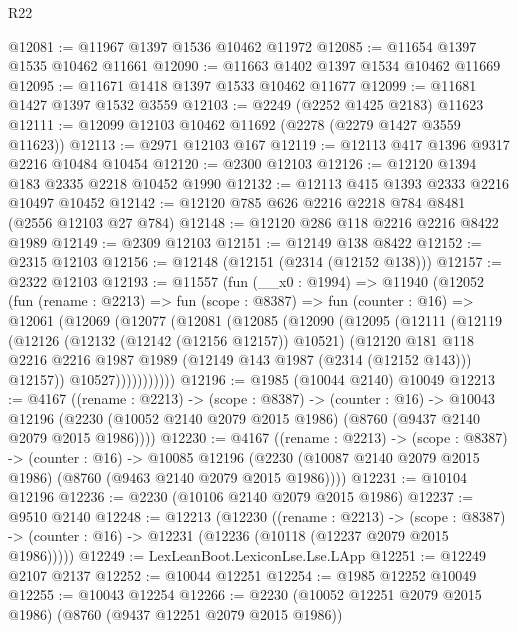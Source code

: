 \begin{lexlean}{R22}
\begin{coremodule}
@12081 := @11967 @1397 @1536 @10462 @11972
@12085 := @11654 @1397 @1535 @10462 @11661
@12090 := @11663 @1402 @1397 @1534 @10462 @11669
@12095 := @11671 @1418 @1397 @1533 @10462 @11677
@12099 := @11681 @1427 @1397 @1532 @3559
@12103 := @2249 (@2252 @1425 @2183) @11623
@12111 := @12099 @12103 @10462 @11692 (@2278 (@2279 @1427 @3559 @11623))
@12113 := @2971 @12103 @167
@12119 := @12113 @417 @1396 @9317 @2216 @10484 @10454
@12120 := @2300 @12103
@12126 := @12120 @1394 @183 @2335 @2218 @10452 @1990
@12132 := @12113 @415 @1393 @2333 @2216 @10497 @10452
@12142 := @12120 @785 @626 @2216 @2218 @784 @8481 (@2556 @12103 @27 @784)
@12148 := @12120 @286 @118 @2216 @2216 @8422 @1989
@12149 := @2309 @12103
@12151 := @12149 @138 @8422
@12152 := @2315 @12103
@12156 := @12148 (@12151 (@2314 (@12152 @138)))
@12157 := @2322 @12103
@12193 := @11557
    (fun (__x0 : @1994) =>
    @11940
      (@12052
        (fun (rename : @2213) =>
        fun (scope : @8387) =>
        fun (counter : @16) =>
        @12061
          (@12069
            (@12077
              (@12081
                (@12085
                  (@12090
                    (@12095
                      (@12111
                        (@12119
                          (@12126
                            (@12132 (@12142 (@12156 @12157)) @10521)
                            (@12120
                              @181
                              @118
                              @2216
                              @2216
                              @1987
                              @1989
                              (@12149 @143 @1987 (@2314 (@12152 @143)))
                              @12157))
                          @10527)))))))))))
@12196 := @1985 (@10044 @2140) @10049
@12213 := @4167
    ((rename : @2213) ->
    (scope : @8387) ->
    (counter : @16) ->
    @10043 @12196 (@2230 (@10052 @2140 @2079 @2015 @1986) (@8760 (@9437 @2140 @2079 @2015 @1986))))
@12230 := @4167
    ((rename : @2213) ->
    (scope : @8387) ->
    (counter : @16) ->
    @10085 @12196 (@2230 (@10087 @2140 @2079 @2015 @1986) (@8760 (@9463 @2140 @2079 @2015 @1986))))
@12231 := @10104 @12196
@12236 := @2230 (@10106 @2140 @2079 @2015 @1986)
@12237 := @9510 @2140
@12248 := @12213
    (@12230
      ((rename : @2213) ->
      (scope : @8387) -> (counter : @16) -> @12231 (@12236 (@10118 (@12237 @2079 @2015 @1986)))))
@12249 := LexLeanBoot.LexiconLse.Lse.LApp
@12251 := @12249 @2107 @2137
@12252 := @10044 @12251
@12254 := @1985 @12252 @10049
@12255 := @10043 @12254
@12266 := @2230 (@10052 @12251 @2079 @2015 @1986) (@8760 (@9437 @12251 @2079 @2015 @1986))

\end{coremodule}
\end{lexlean}

